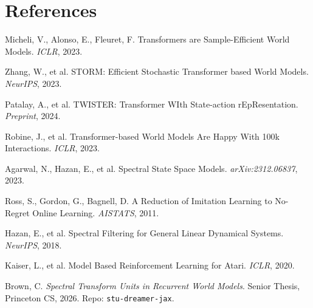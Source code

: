 \documentclass[10pt, letterpaper]{article}
\begin{document}
\section*{References}
\begin{enumerate}[leftmargin=1.5em, nosep, label={[\arabic*]}]
    \item Micheli, V., Alonso, E., Fleuret, F. Transformers are Sample-Efficient World Models. \textit{ICLR}, 2023.
    \item Zhang, W., et al. STORM: Efficient Stochastic Transformer based World Models. \textit{NeurIPS}, 2023.
    \item Patalay, A., et al. TWISTER: Transformer WIth State-action rEpResentation. \textit{Preprint}, 2024.
    \item Robine, J., et al. Transformer-based World Models Are Happy With 100k Interactions. \textit{ICLR}, 2023.
    \item Agarwal, N., Hazan, E., et al. Spectral State Space Models. \textit{arXiv:2312.06837}, 2023.
    \item Ross, S., Gordon, G., Bagnell, D. A Reduction of Imitation Learning to No-Regret Online Learning. \textit{AISTATS}, 2011.
    \item Hazan, E., et al. Spectral Filtering for General Linear Dynamical Systems. \textit{NeurIPS}, 2018.
    \item Kaiser, L., et al. Model Based Reinforcement Learning for Atari. \textit{ICLR}, 2020.
    \item Brown, C. \textit{Spectral Transform Units in Recurrent World Models}. Senior Thesis, Princeton CS, 2026. Repo: \texttt{stu-dreamer-jax}.
\end{enumerate}
\end{document}
